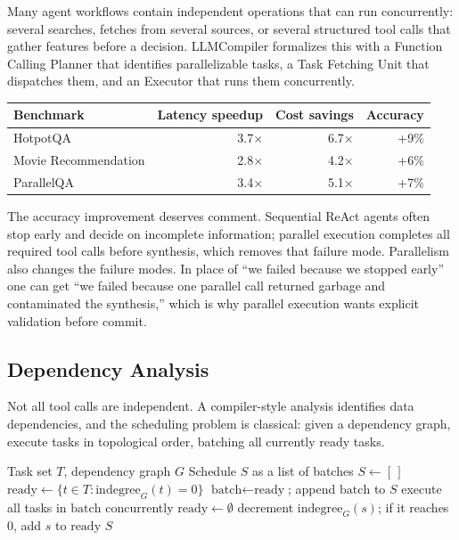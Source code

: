 \documentclass[11pt]{book}
\begin{document}
Many agent workflows contain independent operations that can run concurrently: several searches, fetches from several sources, or several structured tool calls that gather features before a decision. LLMCompiler \cite{kim2024llmcompiler} formalizes this with a Function Calling Planner that identifies parallelizable tasks, a Task Fetching Unit that dispatches them, and an Executor that runs them concurrently.

\begin{center}
\begin{tabular}{lrrr}
\toprule
Benchmark & Latency speedup & Cost savings & Accuracy \\
\midrule
HotpotQA & 3.7$\times$ & 6.7$\times$ & +9\% \\
Movie Recommendation & 2.8$\times$ & 4.2$\times$ & +6\% \\
ParallelQA & 3.4$\times$ & 5.1$\times$ & +7\% \\
\bottomrule
\end{tabular}
\end{center}

The accuracy improvement deserves comment. Sequential ReAct agents often stop early and decide on incomplete information; parallel execution completes all required tool calls before synthesis, which removes that failure mode. Parallelism also changes the failure modes. In place of ``we failed because we stopped early'' one can get ``we failed because one parallel call returned garbage and contaminated the synthesis,'' which is why parallel execution wants explicit validation before commit.

\subsection{Dependency Analysis}

Not all tool calls are independent. A compiler-style analysis identifies data dependencies, and the scheduling problem is classical: given a dependency graph, execute tasks in topological order, batching all currently ready tasks.

\begin{algorithm}
\caption{Parallel Task Scheduling by Topological Batching}
\begin{algorithmic}[1]
\Require Task set $T$, dependency graph $G$
\Ensure Schedule $S$ as a list of batches
\State $S \gets [\,]$
\State $\text{ready} \gets \{t \in T : \text{indegree}_G(t) = 0\}$
    \State $\text{batch} \gets \text{ready}$; append $\text{batch}$ to $S$
    \State execute all tasks in $\text{batch}$ concurrently
    \State $\text{ready} \gets \emptyset$
        \State decrement $\text{indegree}_G(s)$; if it reaches 0, add $s$ to $\text{ready}$
    \EndFor
\EndWhile
\State \Return $S$
\end{algorithmic}
\end{algorithm}
\end{document}
